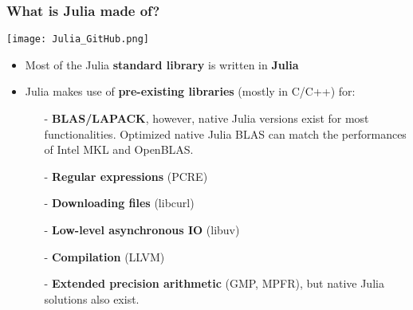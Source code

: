 \documentclass[t,usepdftitle=false]{beamer}
\begin{document}
\begin{frame}
	\frametitle{What is Julia made of?}
	\begin{center}
	\texttt{[image: Julia\_GitHub.png]}  
    \end{center}	
	\begin{itemize}
		\item Most of the Julia \textbf{standard library} is written in \textbf{Julia}\vspace{.1cm}
		\item Julia makes use of \textbf{pre-existing libraries} (mostly in C/C++) for:
		\begin{itemize}\normalsize
			\vspace{.1cm}
			\item[-] \textbf{BLAS/LAPACK}, however, native Julia versions exist for most functionalities. Optimized native Julia BLAS can match the performances of Intel MKL and OpenBLAS.
			\vspace{.1cm}
			\item[-] \textbf{Regular expressions} (PCRE)
			\vspace{.1cm}
            \item[-] \textbf{Downloading files} (libcurl)
            \vspace{.1cm}
			\item[-] \textbf{Low-level asynchronous IO} (libuv)
			\vspace{.1cm}
			\item[-] \textbf{Compilation} (LLVM)
			\vspace{.1cm}
			\item[-] \textbf{Extended precision arithmetic} (GMP, MPFR), but native Julia solutions also exist.			
		\end{itemize}
    \end{itemize}  
\end{frame}   
\end{document}
